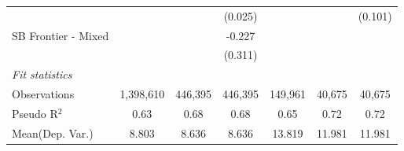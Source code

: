 \begin{tabular}{lcccccc}
                        &               &               & (0.025)       &               &               & (0.101)\\   
   SB Frontier - Mixed  &               &               & -0.227        &               &               &   \\   
                        &               &               & (0.311)       &               &               &   \\   
   \midrule
   \emph{Fit statistics}\\
   Observations         & 1,398,610     & 446,395       & 446,395       & 149,961       & 40,675        & 40,675\\  
   Pseudo R$^2$         & 0.63          & 0.68          & 0.68          & 0.65          & 0.72          & 0.72\\  
Mean(Dep. Var.) & 8.803 & 8.636 & 8.636 & 13.819 & 11.981 & 11.981 \\
   

\end{tabular}
